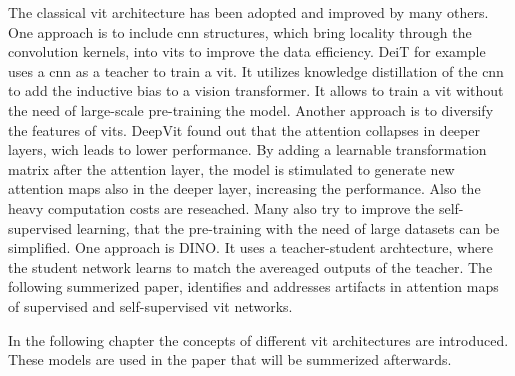 \documentclass[conference]{IEEEtran}
\begin{document}
  The classical \ac{vit} architecture has been adopted and improved by many others. One approach is to include \ac{cnn} structures, which bring locality through the convolution kernels, into \acp{vit} to improve the data efficiency. DeiT \cite{deit} for example uses a \ac{cnn} as a teacher to train a \ac{vit}. It utilizes knowledge distillation of the \ac{cnn} to add the inductive bias to a vision transformer. It allows to train a \ac{vit} without the need of large-scale pre-training the model. \cite{vit-state-challenges} Another approach is to diversify the features of \acp{vit}. DeepVit \cite{deepvit} found out that the attention collapses in deeper layers, wich leads to lower performance. By adding a learnable transformation matrix after the attention layer, the model is stimulated to generate new attention maps also in the deeper layer, increasing the performance. \cite{vit-state-challenges} Also the heavy computation costs are reseached. Many also try to improve the self-supervised learning, that the pre-training with the need of large datasets can be simplified. One approach is DINO. \cite{dino} It uses a teacher-student archtecture, where the student network learns to match the avereaged outputs of the teacher. \cite{vit-state-challenges} The following summerized paper, identifies and addresses artifacts in attention maps of supervised and self-supervised \ac{vit} networks.
  
  In the following chapter the concepts of different \ac{vit} architectures are introduced. These models are used in the paper \cite{registers} that will be summerized afterwards.
\end{document}
